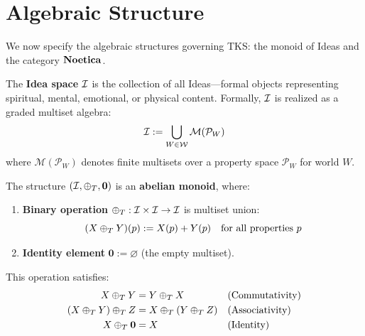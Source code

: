 \section{Algebraic Structure}
\label{sec:algebraic-structure}

We now specify the algebraic structures governing TKS: the monoid of Ideas and the
category $\mathbf{Noetica}$.

\begin{definition}
\label{def:core-idea-space}
The \textbf{Idea space} $\mathcal{I}$ is the collection of all Ideas---formal objects
representing spiritual, mental, emotional, or physical content. Formally, $\mathcal{I}$
is realized as a graded multiset algebra:
\[
    \mathcal{I} := \bigcup_{W \in \mathcal{W}} \mathcal{M}(\mathcal{P}_W)
\]
where $\mathcal{M}(\mathcal{P}_W)$ denotes finite multisets over a property space
$\mathcal{P}_W$ for world $W$.
\end{definition}

\begin{definition}
\label{def:core-monoid}
The structure $(\mathcal{I}, \oplus_T, \mathbf{0})$ is an \textbf{abelian monoid}, where:
\begin{enumerate}[label=(\roman*)]
    \item \textbf{Binary operation} $\oplus_T : \mathcal{I} \times \mathcal{I} \to \mathcal{I}$ is
          multiset union:
          \[
              (X \oplus_T Y)(p) := X(p) + Y(p) \quad \text{for all properties } p
          \]
    \item \textbf{Identity element} $\mathbf{0} := \varnothing$ (the empty multiset).
\end{enumerate}
This operation satisfies:
\begin{align}
    X \oplus_T Y &= Y \oplus_T X && \text{(Commutativity)} \\
    (X \oplus_T Y) \oplus_T Z &= X \oplus_T (Y \oplus_T Z) && \text{(Associativity)} \\
    X \oplus_T \mathbf{0} &= X && \text{(Identity)}
\end{align}
\end{definition}

